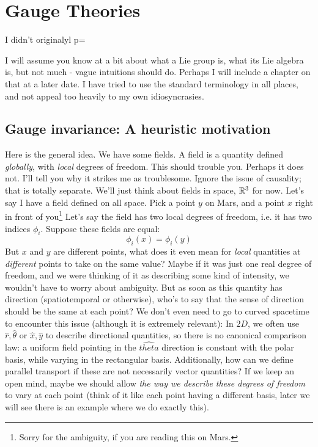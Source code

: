 \documentclass[main.tex]{subfiles}
\begin{document}
\chapter{Gauge Theories}
I didn't originalyl p=

I will assume you know at a bit about what a Lie group is, what its Lie algebra is, but not much - vague intuitions should do. Perhaps I will include a chapter on that at a later date. I have tried to use the standard terminology in all places, and not appeal too heavily to my own idiosyncrasies.

\section{Gauge invariance: A heuristic motivation}

Here is the general idea. We have some fields. A field is a quantity defined \textit{globally}, with \textit{local} degrees of freedom. This should trouble you. Perhaps it does not. I'll tell you why it strikes me as troublesome. Ignore the issue of causality; that is totally separate. We'll just think about fields in space, $\mathbb{R}^3$ for now. Let's say I have a field defined on all space. Pick a point $y$ on Mars, and a point $x$ right in front of you\footnote{Sorry for the ambiguity, if you are reading this on Mars.} Let's say the field has two local degrees of freedom, i.e. it has two indices $\phi_i$. Suppose these fields are equal:
\[
\phi_i (x) = \phi_i (y)
\]
But $x$ and $y$ are different points, what does it even mean for \textit{local} quantities at \textit{different} points to take on the same value? Maybe if it was just one real degree of freedom, and we were thinking of it as describing some kind of intensity, we wouldn't have to worry about ambiguity. But as soon as this quantity has direction (spatiotemporal or otherwise), who's to say that the sense of direction should be the same at each point? We don't even need to go to curved spacetime to encounter this issue (although it is extremely relevant): In $2D$, we often use $\hat{r},\hat{\theta}$ or $\hat{x},\hat{y}$ to describe directional quantities, so there is no canonical comparison law: a uniform field pointing in the $\hat{theta}$ direction is constant with the polar basis, while varying in the rectangular basis. Additionally, how can we define parallel transport if these are not necessarily vector quantities? If we keep an open mind, maybe we should allow \textit{the way we describe these degrees of freedom} to vary at each point (think of it like each point having a different basis, later we will see there is an example where we do exactly this). 
\end{document}
